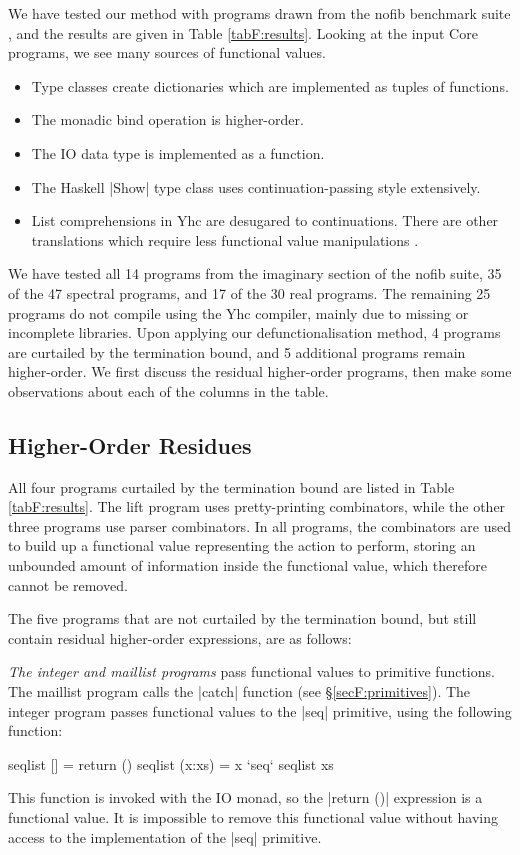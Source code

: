 We have tested our method with programs drawn from the nofib benchmark suite \cite{nofib}, and the results are given in Table \ref{tabF:results}. Looking at the input Core programs, we see many sources of functional values.

\begin{itemize}
\item Type classes create dictionaries which are implemented as tuples of functions.
\item The monadic bind operation is higher-order.
\item The IO data type is implemented as a function.
\item The Haskell |Show| type class uses continuation-passing style extensively.
\item List comprehensions in Yhc are desugared to continuations. There are other translations which require less functional value manipulations \cite{coutts:stream_fusion}.
\end{itemize}

We have tested all 14 programs from the imaginary section of the nofib suite, 35 of the 47 spectral programs, and 17 of the 30 real programs. The remaining 25 programs do not compile using the Yhc compiler, mainly due to missing or incomplete libraries. Upon applying our defunctionalisation method, 4 programs are curtailed by the termination bound, and 5 additional programs remain higher-order. We first discuss the residual higher-order programs, then make some observations about each of the columns in the table.

\subsection{Higher-Order Residues}

All four programs curtailed by the termination bound are listed in Table \ref{tabF:results}. The lift program uses pretty-printing combinators, while the other three programs use parser combinators. In all programs, the combinators are used to build up a functional value representing the action to perform, storing an unbounded amount of information inside the functional value, which therefore cannot be removed.

The five programs that are not curtailed by the termination bound, but still contain residual higher-order expressions, are as follows:

\begin{example}
\textit{The integer and maillist programs} pass functional values to primitive functions. The maillist program calls the |catch| function (see \S\ref{secF:primitives}). The integer program passes functional values to the |seq| primitive, using the following function:

\begin{code}
seqlist []      = return ()
seqlist (x:xs)  = x `seq` seqlist xs
\end{code}

This function is invoked with the IO monad, so the |return ()| expression is a functional value. It is impossible to remove this functional value without having access to the implementation of the |seq| primitive.
\end{example}

